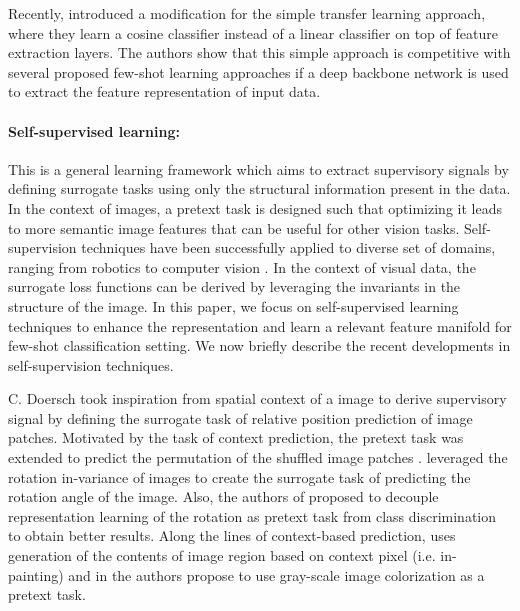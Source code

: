\documentclass[10pt,twocolumn,letterpaper]{article}
\begin{document}
Recently, \cite{chen2019closerfewshot} introduced a modification for the simple transfer learning approach, where they learn a cosine classifier \cite{fewshot2018cc,fewshot2018cc2} instead of a linear classifier on top of feature extraction layers. The authors show that this simple approach is competitive with several proposed few-shot learning approaches if a deep backbone network is used to extract the feature representation of input data.


\paragraph{Self-supervised learning:}
This is a general learning framework which aims to extract supervisory signals by defining surrogate tasks using only the structural information present in the data. In the context of images, a pretext task is designed such that optimizing it leads to more semantic image features that can be useful for other vision tasks. Self-supervision techniques have been successfully applied to diverse set of domains, ranging from robotics to computer vision \cite{robot2018,robot2018_2,TCN2017,crossmodal2018,multisensory2018}. In the context of visual data, the surrogate loss functions can be derived by leveraging the invariants in the structure of the image. In this paper, we focus on self-supervised learning techniques to enhance the representation and learn a relevant feature manifold for few-shot classification setting. We now briefly describe the recent developments in self-supervision techniques. 

C. Doersch \etal \cite{doersch2015seminal} took inspiration from spatial context of a image to derive supervisory signal by defining the surrogate task of relative position prediction of image patches. Motivated by the task of context prediction, the pretext task was extended to predict the permutation of the shuffled image patches \cite{Noroozi2018jigsaw,Nathan2018improve,Noroozi2018improve}. \cite{Spyros2018rotate} leveraged the rotation in-variance of images to create the surrogate task of predicting the rotation angle of the image. Also, the authors of \cite{rotate_decouple_2019} proposed to decouple representation learning of the rotation as pretext task from class discrimination to obtain better results. Along the lines of context-based prediction, \cite{painting2018} uses generation of the contents of image region based on context pixel (i.e. in-painting) and in \cite{color2018,color_2018_1} the authors propose to use gray-scale image colorization as a pretext task.
\end{document}
